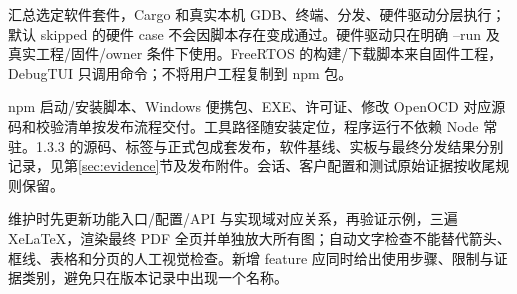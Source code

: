 \documentclass[UTF8,a4paper,11pt,oneside,fontset=none]{ctexart}
\begin{document}
 汇总选定软件套件，Cargo 和真实本机 GDB、终端、分发、硬件驱动分层执行；默认 skipped 的硬件 case 不会因脚本存在变成通过。硬件驱动只在明确 --run 及真实工程/固件/owner 条件下使用。FreeRTOS 的构建/下载脚本来自固件工程，DebugTUI 只调用命令；不将用户工程复制到 npm 包。

npm 启动/安装脚本、Windows 便携包、EXE、许可证、修改 OpenOCD 对应源码和校验清单按发布流程交付。工具路径随安装定位，程序运行不依赖 Node 常驻。1.3.3 的源码、标签与正式包成套发布，软件基线、实板与最终分发结果分别记录，见第\ref{sec:evidence}节及发布附件。会话、客户配置和测试原始证据按收尾规则保留。

维护时先更新功能入口/配置/API 与实现域对应关系，再验证示例，三遍 XeLaTeX，渲染最终 PDF 全页并单独放大所有图；自动文字检查不能替代箭头、框线、表格和分页的人工视觉检查。新增 feature 应同时给出使用步骤、限制与证据类别，避免只在版本记录中出现一个名称。
\end{document}
